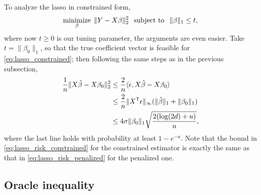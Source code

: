 \documentclass{article}
\begin{document}
To analyze the lasso in constrained form,
\begin{equation}
\label{eq:lasso_constrained}
\mathop{\mathrm{minimize}}_\beta \; \|Y - X\beta\|_2^2 \;\; \mathop{\mathrm{subject\,\,to}} \;\; \|\beta\|_1 \leq t,
\end{equation}
where now $t \geq 0$ is our tuning parameter, the arguments are even
easier. Take $t = \|\beta_0\|_1$, so that the true coefficient vector is
feasible for \eqref{eq:lasso_constrained}; then following the same steps as in
the previous subsection,   
\begin{align}
\nonumber
\frac{1}{n} \|X\hat{\beta} - X\beta_0\|_2^2  
&\leq \frac{2}{n} \langle \epsilon, X\hat{\beta} - X\beta_0 \rangle \\
\nonumber
&\leq \frac{2}{n} \|X^{\mathsf{T}} \epsilon\|_\infty (\|\hat{\beta}\|_1 + \|\beta_0\|_1) \\ 
\label{eq:lasso_risk_constrained}
&\leq 4 \sigma \|\beta_0\|_1 \sqrt{\frac{2 (\log(2d) + u)}{n}},
\end{align}
where the last line holds with probability at least $1-e^{-u}$. Note that the
bound in \eqref{eq:lasso_risk_constrained} for the constrained estimator is
exactly the same as that in \eqref{eq:lasso_risk_penalized} for the penalized 
one. 

\subsection{Oracle inequality}
\end{document}
